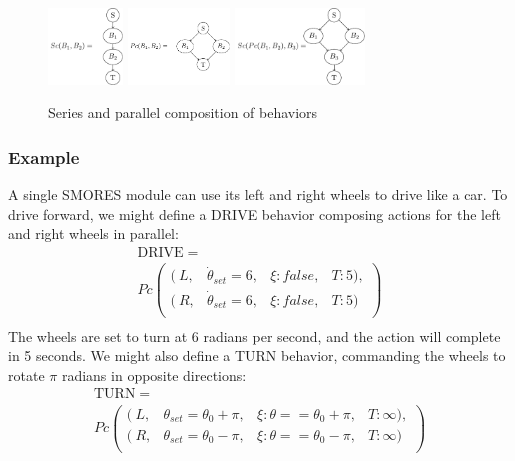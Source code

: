 \documentclass[conference]{IEEEtran}
\theoremstyle{definition}
\begin{document}
\begin{figure}
\begin{center}
\includegraphics[height=0.8in]{images/tikz/series.pdf}
\includegraphics[height=0.8in]{images/tikz/parallel.pdf} \vspace{0.in}
\includegraphics[height=0.8in]{images/tikz/parallel-and-series.pdf}
\end{center}
\caption{Series and parallel composition of behaviors }
\label{fig:graph-composition}
\end{figure}

\subsubsection*{Example}
A single SMORES module can use its left and right wheels to drive like a car. To
drive forward, we might define a DRIVE behavior composing actions for  the left and right wheels
in parallel:\begin{align*}
\mathrm{DRIVE} =~~~~~~~~~~~~~~~~~~~~~~~~~~~~~~~~~~~~~~~~~~~~~~~~~~~ \\
Pc \left( \begin{array}{cccc}
(~L, & \dot\theta_{set}=6, & \xi:false, & T:5), \\
(~R, & \dot\theta_{set}=6, & \xi:false, & T:5) \\
\end{array} \right)\\
\end{align*}
The wheels are set to turn at 6 radians per second, and the action will complete
in 5 seconds.  We might also define a TURN behavior, commanding the wheels to rotate \(\pi\) radians
in opposite directions:
\begin{align*}
\mathrm{TURN} =~~~~~~~~~~~~~~~~~~~~~~~~~~~~~~~~~~~~~~~~~~~~~~~~~~~~~~~~~~~~ \\
Pc \left( \begin{array}{cccc}
(~L, & \theta_{set}=\theta_0+\pi, & \xi:\theta==\theta_0+\pi, & T:\infty), \\
(~R, & \theta_{set}=\theta_0-\pi, & \xi:\theta==\theta_0-\pi, & T:\infty) \\
\end{array} \right)\\
\end{align*}
\end{document}
